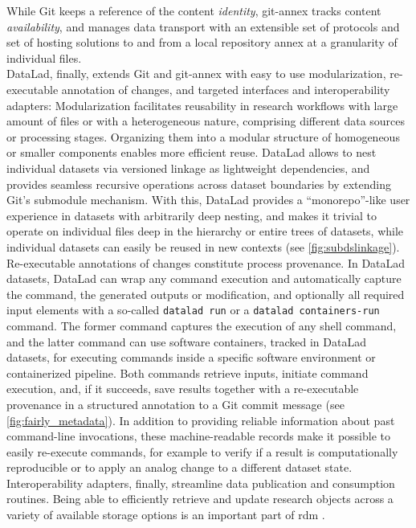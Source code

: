 {While Git keeps a reference of the content \textit{identity}, git-annex tracks content \textit{availability}, and manages data transport with an extensible set of protocols and set of hosting solutions to and from a local repository annex at a granularity of individual files. \\
DataLad, finally, extends Git and git-annex with easy to use modularization, re-executable annotation of changes, and targeted interfaces and interoperability adapters:
Modularization facilitates reusability in research workflows with large amount of files or with a heterogeneous nature, comprising different data sources or processing stages.
Organizing them into a modular structure of homogeneous or smaller components enables more efficient reuse.
DataLad allows to nest individual datasets via versioned linkage as lightweight dependencies, and provides seamless recursive operations across dataset boundaries by extending Git’s submodule mechanism.
With this, DataLad provides a ``monorepo''-like user experience in datasets with arbitrarily deep nesting, and makes it trivial to operate on individual files deep in the hierarchy or entire trees of datasets, while individual datasets can easily be reused in new contexts (see \cref{fig:subdslinkage}).\\
Re-executable annotations of changes constitute process provenance.
In DataLad datasets, DataLad can wrap any command execution and automatically capture the command, the generated outputs or modification, and optionally all required input elements with a so-called \texttt{datalad run} or a \texttt{datalad containers-run} command.
The former command captures the execution of any shell command, and the latter command can use software containers, tracked in DataLad datasets, for executing commands inside a specific software environment or containerized pipeline.
Both commands retrieve inputs, initiate command execution, and, if it succeeds, save results together with a re-executable provenance in a structured annotation to a Git commit message (see \cref{fig:fairly_metadata}).
In addition to providing reliable information about past command-line invocations, these machine-readable records make it possible to easily re-execute commands, for example to verify if a result is computationally reproducible or to apply an analog change to a different dataset state.\\
Interoperability adapters, finally, streamline data publication and consumption routines.
Being able to efficiently retrieve and update research objects across a variety of available storage options is an important part of \gls{rdm} \citep{borghi2018data}.
}
